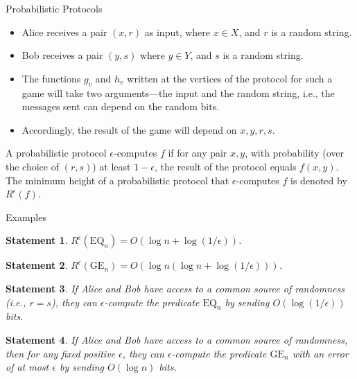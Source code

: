\documentclass[
aspectratio=169]{beamer}
\newcommand{\pitem}{\pause\item}
\newtheorem{statement}{Statement}
\begin{document}
\begin{frame}{Probabilistic Protocols}
    \begin{itemize}
    \item Alice receives a pair $(x,r)$ as input, where $x \in X$, and $r$ is a random string.
    \pitem Bob receives a pair $(y,s)$ where $y \in Y$, and $s$ is a random string.
    \pitem The functions $g_v$ and $h_v$ written at the vertices of the protocol for such a game will take two arguments—the input and the random string, i.e., the messages sent can depend on the random bits.

    \pitem Accordingly, the result of the game will depend on $x,y,r,s$.
    \end{itemize}

    \pause
    \begin{definition}
        A probabilistic protocol $\epsilon$-computes $f$ if for any pair $x,y$, with probability (over the choice of $(r,s)$) at least $1 - \epsilon$, the result of the protocol equals $f(x,y)$. The minimum height of a probabilistic protocol that $\epsilon$-computes $f$ is denoted by $R^\epsilon(f)$.
    \end{definition}

\end{frame}

\begin{frame}{Examples}
    \begin{statement}
        $R^\epsilon(\mathrm{EQ}_n) = O(\log n + \log(1/\epsilon))$.
    \end{statement}

    \pause
    \begin{statement}
        $R^\epsilon(\mathrm{GE}_n) = O(\log n(\log n + \log(1/\epsilon)))$.
    \end{statement}

    \pause
    \begin{statement}
        If Alice and Bob have access to a common source of randomness (i.e., $r = s$), they can $\epsilon$-compute the predicate $\mathrm{EQ}_n$ by sending $O(\log(1/\epsilon))$ bits.
    \end{statement}

    \pause
    \begin{statement}
        If Alice and Bob have access to a common source of randomness, then for any fixed positive $\epsilon$, they can $\epsilon$-compute the predicate $\mathrm{GE}_n$ with an error of at most $\epsilon$ by sending $O(\log n)$ bits.
    \end{statement}
\end{frame}
\end{document}
